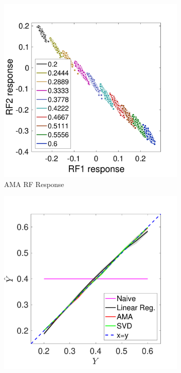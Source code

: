 \documentclass{jov}
\begin{document}
\begin{figure}
\begin{subfigure}[b]{0.20 \textwidth}
        \includegraphics[width=\textwidth]{../Figures/Figure10/Figure10_c.pdf}
        \caption{AMA RF Response}
        \label{fig:case9FiltersResponse}
    \end{subfigure}
        \begin{subfigure}[b]{0.20 \textwidth}
        \includegraphics[width=\textwidth]{../Figures/Figure10/Figure10_d.pdf}

\end{subfigure}
\end{figure}
\end{document}

